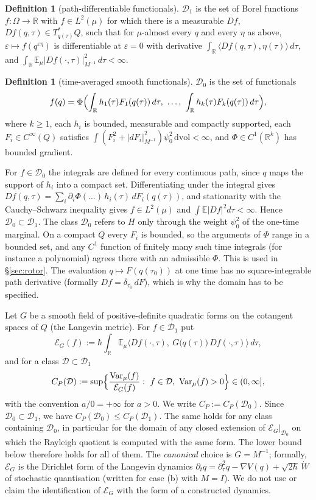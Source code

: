\documentclass[11pt,a4paper]{article}
\theoremstyle{definition}
\newtheorem{definition}[theorem]{Definition}
\theoremstyle{remark}
\newcommand{\E}{\mathbb{E}}
\newcommand{\R}{\mathbb{R}}
\newcommand{\Var}{\operatorname{Var}}
\newcommand{\cE}{\mathcal{E}}
\newcommand{\cD}{\mathcal{D}}
\newcommand{\dvol}{\,\mathrm{dvol}}
\begin{document}
\begin{definition}[path-differentiable functionals]\label{def:D1}
$\cD_1$ is the set of Borel functions $f:\Omega\to\R$ with $f\in L^2(\mu)$ for which there is a measurable $Df$, $Df(q,\tau)\in T^*_{q(\tau)}Q$, such that for $\mu$-almost every $q$ and every $\eta$ as above, $\varepsilon\mapsto f(q^{\varepsilon\eta})$ is differentiable at $\varepsilon=0$ with derivative $\int_\R\langle Df(q,\tau),\eta(\tau)\rangle\,d\tau$, and $\int_\R\E_\mu|Df(\cdot,\tau)|^2_{M^{-1}}\,d\tau<\infty$.
\end{definition}

\begin{definition}[time-averaged smooth functionals]\label{def:D0}
$\cD_0$ is the set of functionals
\[
  f(q)=\Phi\Bigl(\int_\R h_1(\tau)F_1(q(\tau))\,d\tau,\ \dots,\ \int_\R h_k(\tau)F_k(q(\tau))\,d\tau\Bigr),
\]
where $k\ge1$, each $h_i$ is bounded, measurable and compactly supported, each $F_i\in C^\infty(Q)$ satisfies $\int(F_i^2+|dF_i|^2_{M^{-1}})\psi_0^2\dvol<\infty$, and $\Phi\in C^1(\R^k)$ has bounded gradient.
\end{definition}

For $f\in\cD_0$ the integrals are defined for every continuous path, since $q$ maps the support of $h_i$ into a compact set.
Differentiating under the integral gives $Df(q,\tau)=\sum_i\partial_i\Phi(\dots)\,h_i(\tau)\,dF_i(q(\tau))$, and stationarity with the Cauchy--Schwarz inequality gives $f\in L^2(\mu)$ and $\int\E|Df|^2d\tau<\infty$.
Hence $\cD_0\subset\cD_1$.
The class $\cD_0$ refers to $H$ only through the weight $\psi_0^2$ of the one-time marginal.
On a compact $Q$ every $F_i$ is bounded, so the arguments of $\Phi$ range in a bounded set, and any $C^1$ function of finitely many such time integrals (for instance a polynomial) agrees there with an admissible $\Phi$.
This is used in \S\ref{sec:rotor}.
The evaluation $q\mapsto F(q(\tau_0))$ at one time has no square-integrable path derivative (formally $Df=\delta_{\tau_0}\,dF$), which is why the domain has to be specified.

Let $G$ be a smooth field of positive-definite quadratic forms on the cotangent spaces of $Q$ (the Langevin metric).
For $f\in\cD_1$ put
\[
  \cE_G(f):=\hbar\int_\R\E_\mu\bigl\langle Df(\cdot,\tau),\ G\bigl(q(\tau)\bigr)\,Df(\cdot,\tau)\bigr\rangle\,d\tau ,
\]
and for a class $\cD\subset\cD_1$
\[
  C_P(\cD):=\sup\Bigl\{\frac{\Var_\mu(f)}{\cE_G(f)}:\ f\in\cD,\ \Var_\mu(f)>0\Bigr\}\in(0,\infty],
\]
with the convention $a/0=+\infty$ for $a>0$.
We write $C_P:=C_P(\cD_0)$.
Since $\cD_0\subset\cD_1$, we have $C_P(\cD_0)\le C_P(\cD_1)$.
The same holds for any class containing $\cD_0$, in particular for the domain of any closed extension of $\cE_G|_{\cD_0}$ on which the Rayleigh quotient is computed with the same form.
The lower bound below therefore holds for all of them.
The \emph{canonical} choice is $G=M^{-1}$; formally, $\cE_G$ is the Dirichlet form of the Langevin dynamics $\partial_t q=\partial_\tau^2 q-\nabla V(q)+\sqrt{2\hbar}\,\dot W$ of stochastic quantisation (written for case (b) with $M=I$).
We do not use or claim the identification of $\cE_G$ with the form of a constructed dynamics.
\end{document}
